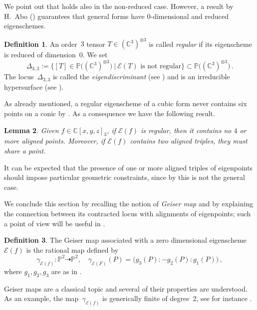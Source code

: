 \documentclass[a4paper, 11pt, reqno]{amsart}
\theoremstyle{plain}
\newtheorem{lemma}{Lemma}[section]
\theoremstyle{definition}
\newtheorem{definition}[lemma]{Definition}
\newcommand{\C}{\mathbb{C}}
\newcommand{\p}{\mathbb{P}}
\newcommand{\Eig}[1]{\mathcal{E}\!\left( {#1} \right)}
\begin{document}
We point out that  holds also in the non-reduced case. However, a result by H.\ Abo (\cite[Corollary 5.8]{Abo}) guarantees that general forms have $0$-dimensional and reduced eigenschemes.

\begin{definition}
\label{definition:eigendiscriminant}
An order~$3$ tensor $T \in (\C^3)^{\otimes 3}$ is called \emph{regular} if its eigenscheme is reduced of dimension~$0$.
We set
%
\[
 \Delta_{3,3} := \{[T]\in \p \bigl( (\C^3)^{\otimes 3} \bigr) \ | \ \Eig{T} \textrm{\ is \ not \ regular} \} \subset \p \bigl( (\C^3)^{\otimes 3} \bigr) \,.
\]
%
The locus~$\Delta_{3,3}$ is called the \emph{eigendiscriminant} (see \cite[Definition 5.5]{Abo}) and is an irreducible hypersurface (see \cite[Corollary 5.8]{Abo}).
\end{definition}

As already mentioned, a regular eigenscheme of a cubic form never contains six points on a conic by \cite[Theorem 5.1]{ASS}. As a consequence we have the following result.

\begin{lemma}
\label{lemma:no_4_aligned}
Given $f \in \C[x,y,z]_3$,
if $\Eig{f}$ is regular, then it contains no $4$ or more aligned points.
Moreover, if $\Eig{f}$ contains two aligned triples, they must share a point.
\end{lemma}

It can be expected that the presence of one or more aligned triples of eigenpoints should impose particular geometric constraints, since by \cite[Theorem 5.7]{BGV} this is not the general case.

We conclude this section by recalling the notion of \emph{Geiser map} and by explaining the connection between its contracted locus with alignments of eigenpoints; such a point of view  will be useful in .

\begin{definition}
The Geiser map associated with a zero dimensional eigenscheme $\Eig{f}$ is the rational map defined by
%
\[
  \gamma_{\Eig{f}} \colon \p ^2 \dasharrow \p^2, \quad
  \gamma_{\Eig{F}} (P) = \bigl( g_3(P):-g_2(P):g_1(P) \bigr) \,,
\]
%
where $g_1, g_2, g_3$ are as in .
\end{definition}

Geiser maps are a classical topic and several of their properties are understood.
As an example, the map~$\gamma_{\Eig{f}}$ is generically finite of degree~$2$, see for instance \cite[Section~8.7.2]{Dolgachev}.
\end{document}
